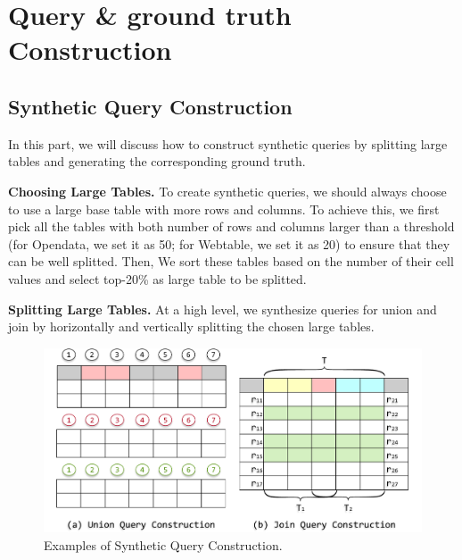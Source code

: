 \section{Query \& ground truth Construction}

\subsection{Synthetic Query Construction}
In this part, we will discuss how to construct synthetic queries by splitting large tables and generating the corresponding ground truth.

\noindent \textbf{Choosing Large Tables.} 
To create synthetic queries, we should always choose to use a large base table with more rows and columns. To achieve this, we first pick all the tables with both number of rows and columns larger than a threshold (\ie for Opendata, we set it as 50; for Webtable, we set it as 20) to ensure that they can be well splitted. Then, We sort these tables based on the number of their cell values and select top-20\%
as large table to be splitted.


\noindent \textbf{Splitting Large Tables.} 
At a high level, we synthesize queries for union and join by  horizontally and vertically splitting the chosen large tables.

\begin{figure}[h]
	\centering
	\includegraphics[width=1\linewidth]{fig/fake_query.pdf}
	\caption{Examples of Synthetic Query Construction.}
	\label{fig:query_construction}
\end{figure}


